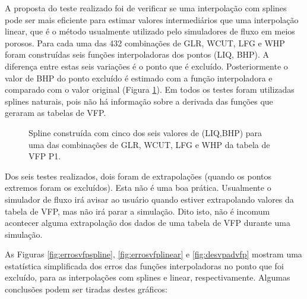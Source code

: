 \documentclass[final,5p]{elsarticle}
\numberwithin{equation}{section}
\begin{document}
        A proposta do teste realizado foi de verificar se uma interpolação com splines pode ser mais eficiente para estimar valores intermediários que uma interpolação linear, que é o método usualmente utilizado pelo simuladores de fluxo em meios porosos. Para cada uma das 432 combinações de GLR, WCUT, LFG e WHP foram construídas seis funções interpoladoras dos pontos (LIQ, BHP). A diferença entre estas seis variações é o ponto que é excluído. Posteriormente o valor de BHP do ponto excluído é estimado com a função interpoladora e comparado com o valor original (Figura \ref{fig:exvfp}). Em todos os testes foram utilizadas splines naturais, pois não há informação sobre a derivada das funções que geraram as tabelas de VFP. 

        \begin{figure}[hbt!] 
            \caption{Spline construída com cinco dos seis valores de (LIQ,BHP) para uma das combinações de GLR, WCUT, LFG e WHP da tabela de VFP P1.}
            \label{fig:exvfp}
        \end{figure}
                
        Dos seis testes realizados, dois foram de extrapolações (quando os pontos extremos foram os excluídos). Esta não é uma boa prática. Usualmente o simulador de fluxo irá avisar ao usuário quando estiver extrapolando valores da tabela de VFP, mas não irá parar a simulação. Dito isto, não é incomum acontecer alguma extrapolação dos dados de uma tabela de VFP durante uma simulação.
        
        As Figuras \ref{fig:errosvfpspline}, \ref{fig:errosvfplinear} e \ref{fig:desvpadvfp} mostram uma estatística simplificada dos erros das funções interpoladoras no ponto que foi excluído, para as interpolações com splines e linear, respectivamente. Algumas conclusões podem ser tiradas destes gráficos:
\end{document}
